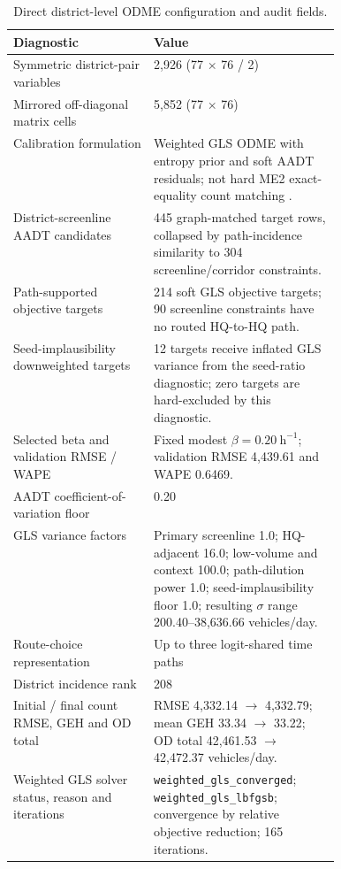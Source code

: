 \documentclass[11pt,a4paper]{article}
\begin{document}
\begin{table}[H]
\centering
\caption{Direct district-level ODME configuration and audit fields.}
\begin{tabularx}{\linewidth}{L{0.43\linewidth} Y}
\toprule
\textbf{Diagnostic} & \textbf{Value} \\
\midrule
Symmetric district-pair variables & 2,926 (77 $\times$ 76 / 2) \\
Mirrored off-diagonal matrix cells & 5,852 (77 $\times$ 76) \\
Calibration formulation & Weighted GLS ODME with entropy prior and soft AADT
residuals; not hard ME2 exact-equality count matching
\cite{cascetta1984,spiess1990}. \\
District-screenline AADT candidates & 445 graph-matched target rows, collapsed
by path-incidence similarity to 304 screenline/corridor constraints. \\
Path-supported objective targets & 214 soft GLS objective targets; 90
screenline constraints have no routed HQ-to-HQ path. \\
Seed-implausibility downweighted targets & 12 targets receive inflated GLS
variance from the seed-ratio diagnostic; zero targets are hard-excluded by this
diagnostic. \\
Selected beta and validation RMSE / WAPE & Fixed modest $\beta=0.20~\mathrm{h}^{-1}$;
validation RMSE 4,439.61 and WAPE 0.6469. \\
AADT coefficient-of-variation floor & 0.20 \\
GLS variance factors & Primary screenline 1.0; HQ-adjacent 16.0; low-volume
and context 100.0; path-dilution power 1.0; seed-implausibility floor 1.0;
resulting $\sigma$ range 200.40--38,636.66 vehicles/day. \\
Route-choice representation & Up to three logit-shared time paths \\
District incidence rank & 208 \\
Initial / final count RMSE, GEH and OD total & RMSE 4,332.14 $\rightarrow$
4,332.79; mean GEH 33.34 $\rightarrow$ 33.22; OD total 42,461.53 $\rightarrow$
42,472.37 vehicles/day. \\
Weighted GLS solver status, reason and iterations & \texttt{weighted\_gls\_converged};
\texttt{weighted\_gls\_lbfgsb}; convergence by relative objective reduction;
165 iterations. \\
\bottomrule
\end{tabularx}
\end{table}
\end{document}
